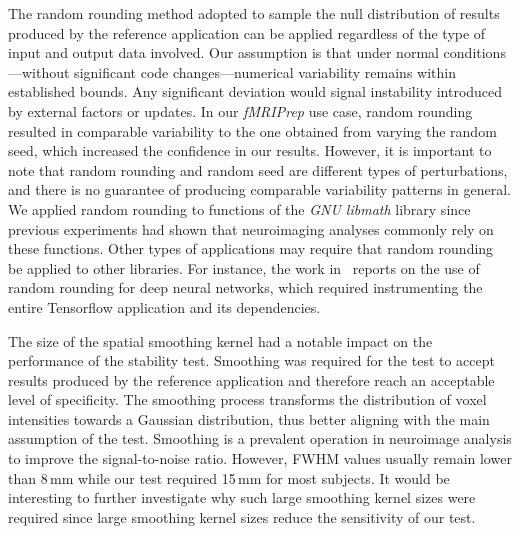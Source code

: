 \documentclass[lettersize,journal]{IEEEtran}
\newcommand{\fmriprep}{\emph{fMRIPrep}\xspace}
\newcommand{\add}[1]{\textcolor{green!60!black}{#1}} %
\begin{document}
The random rounding method adopted to sample the null distribution of results
produced by the reference application can be applied regardless of the type of
input and output data involved. \add{Our assumption is that under normal
  conditions—without significant code changes—numerical variability remains
  within established bounds. Any significant deviation would signal instability
  introduced by external factors or updates.} In our \fmriprep use case, random
rounding resulted in comparable variability to the one obtained from varying
the random seed, which increased the confidence in our results. However, it is
important to note that random rounding and random seed are different types of
perturbations, and there is no guarantee of producing comparable variability
patterns in general. We applied random rounding to functions of the \emph{GNU
  libmath} library since previous experiments had shown that neuroimaging
analyses commonly rely on these functions. Other types of applications may
require that random rounding be applied to other libraries. For instance, the
work in~\cite{gonzalez2024numerical} reports on the use of random rounding for
deep neural networks, which required instrumenting the entire Tensorflow
application and its dependencies.

The size of the spatial smoothing kernel had a notable impact on the
performance of the stability test. Smoothing was required for the test to
accept results produced by the reference application and therefore reach an
acceptable level of specificity. The smoothing process transforms the
distribution of voxel intensities towards a Gaussian distribution, thus better
aligning with the main assumption of the test. Smoothing is a prevalent
operation in neuroimage analysis to improve the signal-to-noise ratio. However,
FWHM values usually remain lower than 8\,mm while our test required 15\,mm for
most subjects. It would be interesting to further investigate why such large
smoothing kernel sizes were required since large smoothing kernel sizes reduce
the sensitivity of our test.
\end{document}

